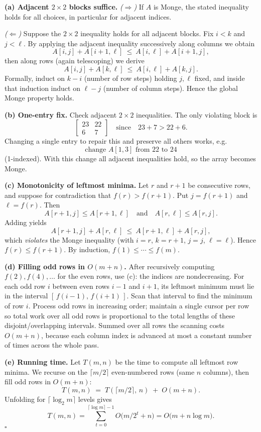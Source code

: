 \documentclass[12pt]{article}
\theoremstyle{definition}
\begin{document}
\medskip
\noindent\textbf{(a) Adjacent $2\times2$ blocks suffice.}
\emph{($\Rightarrow$)} If $A$ is Monge, the stated inequality holds for all choices, in particular
for adjacent indices.

\emph{($\Leftarrow$)} Suppose the $2\times2$ inequality holds for all adjacent blocks.
Fix $i<k$ and $j<\ell$. By applying the adjacent inequality successively along columns we obtain
\[
A[i,j]+A[i+1,\ell]\ \le\ A[i,\ell]+A[i+1,j],
\]
then along rows (again telescoping) we derive
\[
A[i,j]+A[k,\ell]\ \le\ A[i,\ell]+A[k,j].
\]
Formally, induct on $k-i$ (number of row steps) holding $j,\ell$ fixed, and inside that induction
induct on $\ell-j$ (number of column steps). Hence the global Monge property holds.

\medskip
\noindent\textbf{(b) One-entry fix.}
Check adjacent $2\times2$ inequalities. The only violating block is
\[
\begin{bmatrix}
23&22\\
6&7
\end{bmatrix}
\quad\text{since}\quad 23+7>22+6.
\]
Changing a single entry to repair this and preserve all others works, e.g.
\[
\boxed{\text{change }A[1,3]\text{ from }22\text{ to }24}
\]
(1-indexed). With this change all adjacent inequalities hold, so the array becomes Monge.

\medskip
\noindent\textbf{(c) Monotonicity of leftmost minima.}
Let $r$ and $r+1$ be consecutive rows, and suppose for contradiction that
$f(r)>f(r+1)$. Put $j=f(r+1)$ and $\ell=f(r)$. Then
\[
A[r+1,j]\le A[r+1,\ell]\quad\text{and}\quad A[r,\ell]\le A[r,j].
\]
Adding yields
\[
A[r+1,j]+A[r,\ell]\ \le\ A[r+1,\ell]+A[r,j],
\]
which \emph{violates} the Monge inequality (with $i=r$, $k=r+1$, $j=j$, $\ell=\ell$). Hence
$f(r)\le f(r+1)$. By induction, $f(1)\le\cdots\le f(m)$.

\medskip
\noindent\textbf{(d) Filling odd rows in $O(m+n)$.}
After recursively computing $f(2),f(4),\ldots$ for the even rows, use (c): the indices are
nondecreasing. For each odd row $i$ between even rows $i-1$ and $i+1$, its leftmost minimum
must lie in the interval $[\,f(i-1),\,f(i+1)\,]$. Scan that interval to find the minimum of row $i$.
Process odd rows in increasing order; maintain a single cursor per row so total work over all odd
rows is proportional to the total lengths of these disjoint/overlapping intervals. Summed over all
rows the scanning costs $O(m+n)$, because each column index is advanced at most a constant
number of times across the whole pass.

\medskip
\noindent\textbf{(e) Running time.}
Let $T(m,n)$ be the time to compute all leftmost row minima.
We recurse on the $\lceil m/2\rceil$ even-numbered rows (same $n$ columns), then fill odd rows in
$O(m+n)$:
\[
T(m,n)\;=\;T(\lceil m/2\rceil,\,n)\;+\;O(m+n).
\]
Unfolding for $\lceil\log_2 m\rceil$ levels gives
\[
T(m,n)=\sum_{t=0}^{\lceil\log m\rceil-1} O\!\big(m/2^t+n\big)
=O\!\big(m+n\log m\big).
\]
\hfill$\square$
\end{document}
